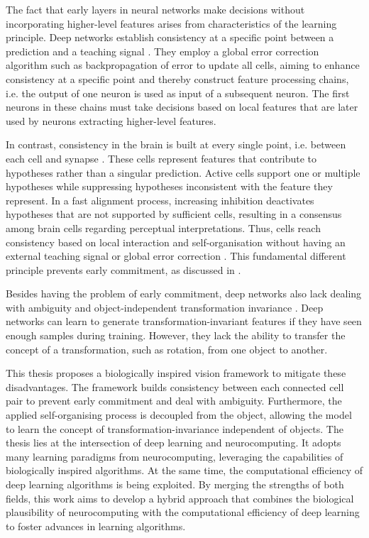 The fact that early layers in neural networks make decisions without incorporating higher-level features arises from characteristics of the learning principle.
Deep networks establish consistency at a specific point between a prediction and a teaching signal .
They employ a global error correction algorithm such as backpropagation of error  to update all cells, aiming to enhance consistency at a specific point and thereby construct feature processing chains, i.e. the output of one neuron is used as input of a subsequent neuron.
The first neurons in these chains must take decisions based on local features that are later used by neurons extracting higher-level features.

In contrast, consistency in the brain is built at every single point, i.e. between each cell and synapse .
These cells represent features that contribute to hypotheses rather than a singular prediction.
Active cells support one or multiple hypotheses while suppressing hypotheses inconsistent with the feature they represent.
In a fast alignment process, increasing inhibition  deactivates hypotheses that are not supported by sufficient cells, resulting in a consensus among brain cells regarding perceptual interpretations.
Thus, cells reach consistency based on local interaction and self-organisation  without having an external teaching signal or global error correction . This fundamental different principle prevents early commitment, as discussed in .

Besides having the problem of early commitment, deep networks also lack dealing with ambiguity and object-independent transformation invariance \cite{gerber_stride_2020, madan_when_2022}.
Deep networks can learn to generate transformation-invariant features if they have seen enough samples during training.
However, they lack the ability to transfer the concept of a transformation, such as rotation, from one object to another.

This thesis proposes a biologically inspired vision framework to mitigate these disadvantages. 
The framework builds consistency between each connected cell pair to prevent early commitment and deal with ambiguity.
Furthermore, the applied self-organising process is decoupled from the object, allowing the model to learn the concept of transformation-invariance independent of objects.
The thesis lies at the intersection of deep learning and neurocomputing. It adopts many learning paradigms from neurocomputing, leveraging the capabilities of biologically inspired algorithms. At the same time, the computational efficiency of deep learning algorithms is being exploited. By merging the strengths of both fields, this work aims to develop a hybrid approach that combines the biological plausibility of neurocomputing with the computational efficiency of deep learning to foster advances in learning algorithms.


